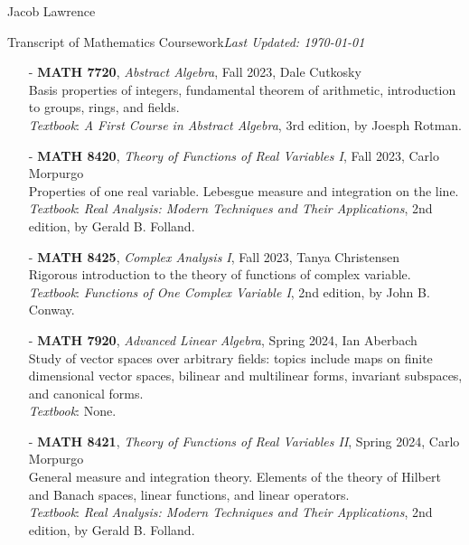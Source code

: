 \documentclass{article}
\begin{document}
\huge Jacob Lawrence

\large Transcript of Mathematics Coursework\hfill \normalsize \textit{Last Updated: \today}

\begin{enumerate}
    \item[-] \textbf{MATH 7720}, \textit{Abstract Algebra}, Fall 2023, Dale Cutkosky \\ 
    Basis properties of integers, fundamental theorem of arithmetic, introduction to groups, rings, and fields.\\
    \textit{Textbook}: \textit{A First Course in Abstract Algebra}, 3rd edition, by Joesph Rotman.  

    \item[-] \textbf{MATH 8420}, \textit{Theory of Functions of Real Variables I}, Fall 2023, Carlo Morpurgo\\
    Properties of one real variable. Lebesgue measure and integration on the line. \\
    \textit{Textbook}: \textit{Real Analysis: Modern Techniques and Their Applications}, 2nd edition, by Gerald B. Folland. 

    \item[-] \textbf{MATH 8425}, \textit{Complex Analysis I}, Fall 2023, Tanya Christensen\\
    Rigorous introduction to the theory of functions of complex variable. \\
    \textit{Textbook}: \textit{Functions of One Complex Variable I}, 2nd edition, by John B. Conway. 
    
    \item[-] \textbf{MATH 7920}, \textit{Advanced Linear Algebra}, Spring 2024, Ian Aberbach\\
    Study of vector spaces over arbitrary fields: topics include maps on finite dimensional vector spaces, bilinear and multilinear forms, invariant subspaces, and canonical forms. \\
    \textit{Textbook}: None.  

    \item[-] \textbf{MATH 8421}, \textit{Theory of Functions of Real Variables II}, Spring 2024, Carlo Morpurgo \\
    General measure and integration theory. Elements of the theory of Hilbert and Banach spaces, linear functions, and linear operators. \\
    \textit{Textbook}: \textit{Real Analysis: Modern Techniques and Their Applications}, 2nd edition, by Gerald B. Folland. 


\end{enumerate}
\end{document}
